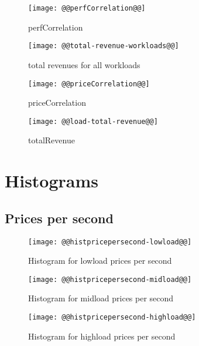 \documentclass[11pt]{article}
\begin{document}
\begin{figure}[htbp]
  \begin{center}
    \texttt{[image: @@perfCorrelation@@]}
    \caption{perfCorrelation}
    \label{fig:perfCorrelation}
  \end{center}
\end{figure}

\begin{figure}[htbp]
  \begin{center}
    \texttt{[image: @@total-revenue-workloads@@]}
    \caption{total revenues for all workloads}
    \label{fig:priceCorrelation}
  \end{center}
\end{figure}

\begin{figure}[htbp]
  \begin{center}
    \texttt{[image: @@priceCorrelation@@]}
    \caption{priceCorrelation}
    \label{fig:priceCorrelation}
  \end{center}
\end{figure}

\begin{figure}[htbp]
  \begin{center}
    \texttt{[image: @@load-total-revenue@@]}
    \caption{totalRevenue}
    \label{fig:totalRevenue}
  \end{center}
\end{figure}


\newpage
\section{Histograms}

\subsection{Prices per second}
\begin{figure}[htbp]
  \begin{center}
    \texttt{[image: @@histpricepersecond-lowload@@]}
    \caption{Histogram for lowload prices per second}
    \label{fig:histpricepersecond-lowload}
  \end{center}
\end{figure}
\begin{figure}[htbp]
  \begin{center}
    \texttt{[image: @@histpricepersecond-midload@@]}
    \caption{Histogram for midload prices per second}
    \label{fig:histpricepersecond-midload}
  \end{center}
\end{figure}
\begin{figure}[htbp]
  \begin{center}
    \texttt{[image: @@histpricepersecond-highload@@]}
    \caption{Histogram for highload prices per second}
    \label{fig:histpricepersecond-highload}
  \end{center}
\end{figure}
\end{document}
